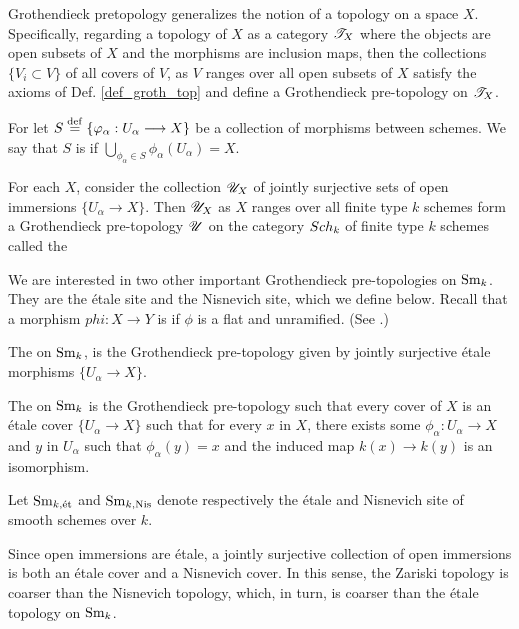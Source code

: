 \begin{rmk}
Grothendieck pretopology generalizes the notion of a topology on
a space $X$. Specifically, regarding a topology of $X$ as a 
category $\mathscr{T}_X$ where the objects are open subsets of $X$ and 
the morphisms are inclusion maps, then the collections $\{V_i 
\subset V\}$ of all covers of $V$, as $V$ ranges over all open 
subsets of $X$ satisfy the axioms of Def. \ref{def_groth_top} and 
define a Grothendieck pre-topology on $\mathscr{T}_X$.
\end{rmk}

\begin{defn}
For let $S \stackrel{\mathrm{def}}{=} \{\varphi_\alpha: U_\alpha \longrightarrow X\}$ be a collection 
of morphisms between schemes. We say that $S$ is  if $\bigcup_{\phi_\alpha \in S} \phi_\alpha(U_\alpha)
= X$.
\end{defn}

\begin{rmk}
For each $X$, consider the collection $\mathscr{U}_X$ of jointly 
surjective sets of open immersions $\{U_\alpha \to X\}$. Then
$\mathscr{U}_X$ as $X$ ranges over all finite type $k$ schemes 
form a Grothendieck pre-topology $\mathscr{U}$ on the category 
$Sch_k$ of finite type $k$ schemes called the 
\end{rmk}

We are interested in two other important Grothendieck 
pre-topologies on $\mathrm{Sm}_{k}$. They are the \'etale site and the 
Nisnevich site, which we define below. Recall that a morphism 
$phi: X \to Y$ is  if $\phi$ is a flat and 
unramified. (See \cite[\S 1.3]{Milne}.)

\begin{defn}
The  on $\mathrm{Sm}_{k}$, is the Grothendieck 
pre-topology given by jointly surjective \'etale morphisms 
$\{U_\alpha \to X\}.$

The  on $\mathrm{Sm}_{k}$ is the Grothendieck 
pre-topology such that every cover of $X$ is an \'etale cover 
$\{U_\alpha \to X\}$ such that for every $x$ in $X$, there exists 
some $\phi_\alpha: U_\alpha \to X$ and $y$ in $U_\alpha$ such that 
$\phi_\alpha(y) = x$ and the induced map $k(x) \to k(y)$ is an 
isomorphism.

Let $\mathrm{Sm}_{k,\mathrm{\acute{e}t}}$ and $\mathrm{Sm}_{k, \mathrm{Nis}}$ denote respectively the \'etale 
and Nisnevich site of smooth schemes over $k$.
\end{defn}

\begin{rmk}\label{rmk_comp_of_tops}
Since open immersions are \'etale, a jointly surjective collection 
of open immersions is both an \'etale cover and a Nisnevich cover. 
In this sense, the Zariski topology is coarser than the Nisnevich 
topology, which, in turn, is coarser than the \'etale topology
on $\mathrm{Sm}_{k}$.
\end{rmk}


